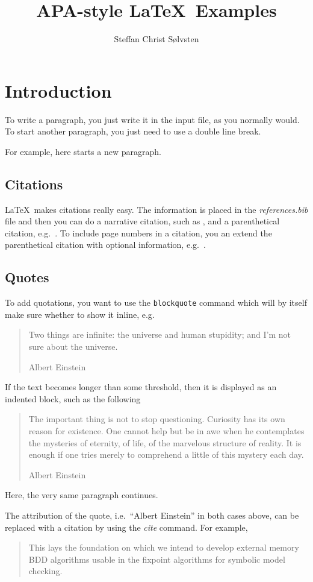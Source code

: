 \documentclass[
    a4paper, %
    stu,     %
]{apa7}
\title{APA-style \LaTeX\ Examples}
\author{Steffan Christ S{\o}lvsten}
\affiliation{Department of Computer Science, Aarhus University}
\begin{document}
\maketitle
\section{Introduction}
To write a paragraph, you just write it in the input file, as you normally
would. To start another paragraph, you just need to use a double line break.

For example, here starts a new paragraph.

\subsection{Citations}
\LaTeX\ makes citations really easy. The information is placed in the
\emph{references.bib} file and then you can do a narrative citation, such as
\textcite{soelvsten2022:TACAS}, and a parenthetical citation,
e.g.~\parencite{soelvsten2022:TACAS}. To include page numbers in a citation, you 
an extend the parenthetical citation with optional information,
e.g.~\parencite[p.~64]{soelvsten2022:TACAS}.

\subsection{Quotes}
To add quotations, you want to use the \texttt{blockquote} command which will by
itself make sure whether to show it inline, e.g.\
\blockquote[Albert Einstein]{Two things are infinite: the universe and human
stupidity; and I'm not sure about the universe.}
If the text becomes longer than some threshold, then it is displayed
as an indented block, such as the following
\blockquote[Albert Einstein]{The important thing is not to stop questioning.
Curiosity has its own reason for existence. One cannot help but be in awe when he
contemplates the mysteries of eternity, of life, of the marvelous structure of
reality. It is enough if one tries merely to comprehend a little of this mystery
each day.}
Here, the very same paragraph continues.

The attribution of the quote, i.e.\ ``Albert Einstein'' in both cases above, can
be replaced with a citation by using the \emph{cite} command. For example,
\blockquote[\cite{soelvsten2022:TACAS}]{This lays the foundation on which we
intend to develop external memory BDD algorithms usable in the fixpoint algorithms
for symbolic model checking.}

\printbibliography
\end{document}
